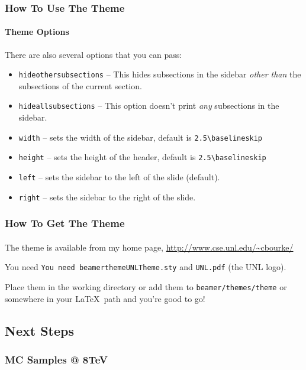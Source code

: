 \documentclass{beamer}
\begin{document}
\begin{frame}[fragile]
    \frametitle{How To Use The Theme}
    \framesubtitle{Theme Options}
        
    There are also several options that you can pass:
    \begin{itemize}
      \item \texttt{hideothersubsections} -- This hides subsections in the 
            sidebar \emph{other than} the subsections of the current section.
      \item \texttt{hideallsubsections} -- This option doesn't print \emph{any}
            subsections in the sidebar.
      \item \texttt{width} -- sets the width of the sidebar, default is 
      	    \verb"2.5\baselineskip"
      \item \texttt{height} -- sets the height of the header, default is 
      	    \verb"2.5\baselineskip"
      \item \texttt{left} -- sets the sidebar to the left of the slide (default).
      \item \texttt{right} -- sets the sidebar to the right of the slide.
    \end{itemize}
    
\end{frame}

\begin{frame}
    \frametitle{How To Get The Theme}
    \framesubtitle{}
    
    The theme is available from my home page,
    \textcolor{blue}{\url{http://www.cse.unl.edu/~cbourke/}}
    

    You need \texttt{You need beamerthemeUNLTheme.sty} and \texttt{UNL.pdf}
    (the UNL logo).
    
    Place them in the working directory or add them to \texttt{beamer/themes/theme}
    or somewhere in your \LaTeX\ path and you're good to go!
    
\end{frame}

\begin{frame}
\section{ Next Steps}
\frametitle{MC Samples @ 8TeV}
\end{frame}
    
\end{document}
